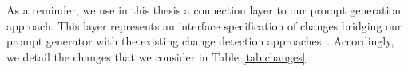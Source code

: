 As a reminder, we use in this thesis a connection layer to our prompt generation approach.  This layer represents an interface specification of changes {\small{}} bridging our prompt generator with the existing change detection approaches~\cite{Alter2015, williams2012searching,cicchetti_managing_2009,langer_posteriori_2013,vermolen_reconstructing_2012,Khelladi2016}.
Accordingly, we detail the changes that we consider in Table \ref{tab:changes}. 
%


